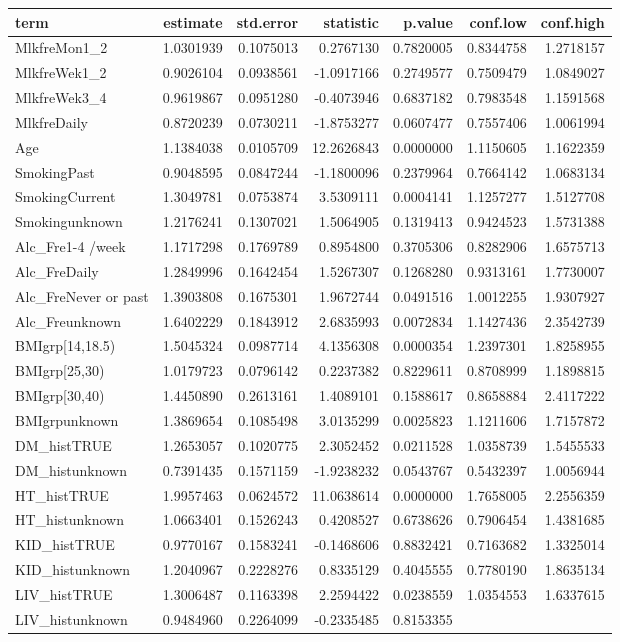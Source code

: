 \documentclass[]{article}
\begin{document}
\begin{longtable}[]{@{}lrrrrrr@{}}
\toprule
term & estimate & std.error & statistic & p.value & conf.low &
conf.high\tabularnewline
\midrule
\endhead
MlkfreMon1\_2 & 1.0301939 & 0.1075013 & 0.2767130 & 0.7820005 &
0.8344758 & 1.2718157\tabularnewline
MlkfreWek1\_2 & 0.9026104 & 0.0938561 & -1.0917166 & 0.2749577 &
0.7509479 & 1.0849027\tabularnewline
MlkfreWek3\_4 & 0.9619867 & 0.0951280 & -0.4073946 & 0.6837182 &
0.7983548 & 1.1591568\tabularnewline
MlkfreDaily & 0.8720239 & 0.0730211 & -1.8753277 & 0.0607477 & 0.7557406
& 1.0061994\tabularnewline
Age & 1.1384038 & 0.0105709 & 12.2626843 & 0.0000000 & 1.1150605 &
1.1622359\tabularnewline
SmokingPast & 0.9048595 & 0.0847244 & -1.1800096 & 0.2379964 & 0.7664142
& 1.0683134\tabularnewline
SmokingCurrent & 1.3049781 & 0.0753874 & 3.5309111 & 0.0004141 &
1.1257277 & 1.5127708\tabularnewline
Smokingunknown & 1.2176241 & 0.1307021 & 1.5064905 & 0.1319413 &
0.9424523 & 1.5731388\tabularnewline
Alc\_Fre1-4 /week & 1.1717298 & 0.1769789 & 0.8954800 & 0.3705306 &
0.8282906 & 1.6575713\tabularnewline
Alc\_FreDaily & 1.2849996 & 0.1642454 & 1.5267307 & 0.1268280 &
0.9313161 & 1.7730007\tabularnewline
Alc\_FreNever or past & 1.3903808 & 0.1675301 & 1.9672744 & 0.0491516 &
1.0012255 & 1.9307927\tabularnewline
Alc\_Freunknown & 1.6402229 & 0.1843912 & 2.6835993 & 0.0072834 &
1.1427436 & 2.3542739\tabularnewline
BMIgrp{[}14,18.5) & 1.5045324 & 0.0987714 & 4.1356308 & 0.0000354 &
1.2397301 & 1.8258955\tabularnewline
BMIgrp{[}25,30) & 1.0179723 & 0.0796142 & 0.2237382 & 0.8229611 &
0.8708999 & 1.1898815\tabularnewline
BMIgrp{[}30,40) & 1.4450890 & 0.2613161 & 1.4089101 & 0.1588617 &
0.8658884 & 2.4117222\tabularnewline
BMIgrpunknown & 1.3869654 & 0.1085498 & 3.0135299 & 0.0025823 &
1.1211606 & 1.7157872\tabularnewline
DM\_histTRUE & 1.2653057 & 0.1020775 & 2.3052452 & 0.0211528 & 1.0358739
& 1.5455533\tabularnewline
DM\_histunknown & 0.7391435 & 0.1571159 & -1.9238232 & 0.0543767 &
0.5432397 & 1.0056944\tabularnewline
HT\_histTRUE & 1.9957463 & 0.0624572 & 11.0638614 & 0.0000000 &
1.7658005 & 2.2556359\tabularnewline
HT\_histunknown & 1.0663401 & 0.1526243 & 0.4208527 & 0.6738626 &
0.7906454 & 1.4381685\tabularnewline
KID\_histTRUE & 0.9770167 & 0.1583241 & -0.1468606 & 0.8832421 &
0.7163682 & 1.3325014\tabularnewline
KID\_histunknown & 1.2040967 & 0.2228276 & 0.8335129 & 0.4045555 &
0.7780190 & 1.8635134\tabularnewline
LIV\_histTRUE & 1.3006487 & 0.1163398 & 2.2594422 & 0.0238559 &
1.0354553 & 1.6337615\tabularnewline
LIV\_histunknown & 0.9484960 & 0.2264099 & -0.2335485 & 0.8153355 &

\end{longtable}
\end{document}
